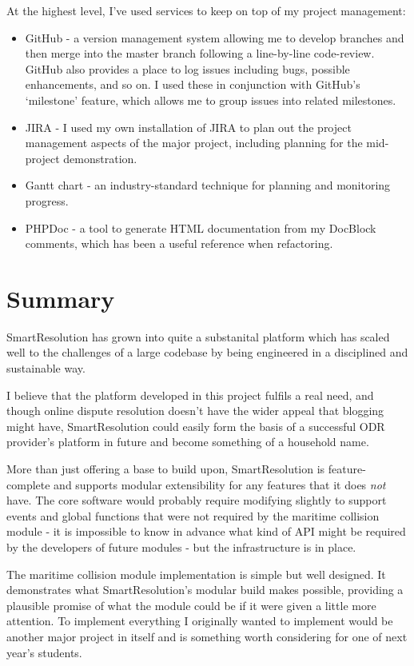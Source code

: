At the highest level, I've used services to keep on top of my project management:

\begin{itemize}
\item GitHub - a version management system allowing me to develop branches and then merge into the master branch following a line-by-line code-review. GitHub also provides a place to log issues including bugs, possible enhancements, and so on. I used these in conjunction with GitHub's `milestone' feature, which allows me to group issues into related milestones.
\item JIRA - I used my own installation of JIRA to plan out the project management aspects of the major project, including planning for the mid-project demonstration.
\item Gantt chart - an industry-standard technique for planning and monitoring progress.
\item PHPDoc - a tool to generate HTML documentation from my DocBlock comments, which has been a useful reference when refactoring.
\end{itemize}

\section{Summary}

SmartResolution has grown into quite a substanital platform which has scaled well to the challenges of a large codebase by being engineered in a disciplined and sustainable way.

I believe that the platform developed in this project fulfils a real need, and though online dispute resolution doesn't have the wider appeal that blogging might have, SmartResolution could easily form the basis of a successful ODR provider's platform in future and become something of a household name.

More than just offering a base to build upon, SmartResolution is feature-complete and supports modular extensibility for any features that it does \emph{not} have. The core software would probably require modifying slightly to support events and global functions that were not required by the maritime collision module - it is impossible to know in advance what kind of API might be required by the developers of future modules - but the infrastructure is in place.

The maritime collision module implementation is simple but well designed. It demonstrates what SmartResolution's modular build makes possible, providing a plausible promise of what the module could be if it were given a little more attention. To implement everything I originally wanted to implement would be another major project in itself and is something worth considering for one of next year's students.

